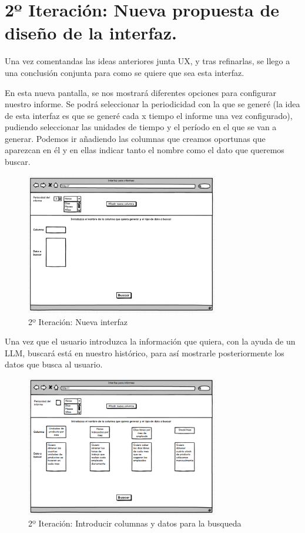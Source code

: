 \section{2º Iteración: Nueva propuesta de diseño de la interfaz.}

Una vez comentandas las ideas anteriores junta UX, y tras refinarlas, se llego a una conclusión conjunta para como 
se quiere que sea esta interfaz.

En esta nueva pantalla, se nos mostrará diferentes opciones para configurar nuestro informe. 
Se podrá seleccionar la periodicidad con la que se generé (la idea de esta interfaz es que se generé cada x tiempo el informe una vez configurado), 
pudiendo seleccionar las unidades de tiempo y el período en el que se van a generar. 
Podemos ir añadiendo las columnas que creamos oportunas que aparezcan en él y en ellas indicar tanto el nombre como el dato que queremos buscar. 

\begin{figure}[hp!]
    \centering
    \includegraphics[width=0.75\textwidth]{imaxes/iteracion2.1.png}
    \caption{2º Iteración: Nueva interfaz}
    \label{fig:iteracion2.1}
\end{figure}

Una vez que el usuario introduzca la información que quiera, con la ayuda de un LLM, buscará está en nuestro histórico, 
para así mostrarle posteriormente los datos que busca al usuario.

\begin{figure}[hp!]
    \centering
    \includegraphics[width=0.75\textwidth]{imaxes/iteracion2.2.png}
    \caption{2º Iteración: Introducir columnas y datos para la busqueda}
    \label{fig:iteracion2.2}
\end{figure}

